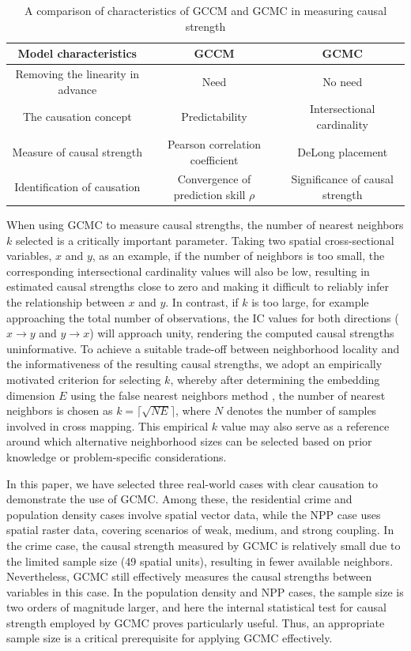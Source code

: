 \documentclass[authoryear,preprint,review,12pt]{elsarticle}
\begin{document}
\begin{table}[htb]
\centering
\caption{A comparison of characteristics of GCCM and GCMC in measuring causal strength}
\label{tbl_diff}
{\scriptsize
\begin{tabular}{|c|c|c|}
\hline
\textbf{Model characteristics} & \textbf{GCCM} & \textbf{GCMC} \\
\hline
Removing the linearity in advance & Need & No need \\
\hline
The causation concept & Predictability & Intersectional cardinality \\
\hline
Measure of causal strength & Pearson correlation coefficient & DeLong placement \\ 
\hline
Identification of causation & Convergence of prediction skill \(\rho\) & Significance of causal strength \\
\hline
\end{tabular}
}
\end{table}

When using GCMC to measure causal strengths, the number of nearest neighbors $k$ selected is a critically important parameter. Taking two spatial cross-sectional variables, $x$ and $y$, as an example, if the number of neighbors is too small, the corresponding intersectional cardinality values will also be low, resulting in estimated causal strengths close to zero and making it difficult to reliably infer the relationship between $x$ and $y$. In contrast, if $k$ is too large, for example approaching the total number of observations, the IC values for both directions ($x \to y$ and $y \to x$) will approach unity, rendering the computed causal strengths uninformative. To achieve a suitable trade-off between neighborhood locality and the informativeness of the resulting causal strengths, we adopt an empirically motivated criterion for selecting $k$, whereby after determining the embedding dimension $E$ using the false nearest neighbors method \citep{kennel1992fnn}, the number of nearest neighbors is chosen as $k = \lceil \sqrt{N E} \rceil$, where $N$ denotes the number of samples involved in cross mapping. This empirical $k$ value may also serve as a reference around which alternative neighborhood sizes can be selected based on prior knowledge or problem-specific considerations.

In this paper, we have selected three real-world cases with clear causation to demonstrate the use of GCMC. Among these, the residential crime and population density cases involve spatial vector data, while the NPP case uses spatial raster data, covering scenarios of weak, medium, and strong coupling. In the crime case, the causal strength measured by GCMC is relatively small due to the limited sample size (49 spatial units), resulting in fewer available neighbors. Nevertheless, GCMC still effectively measures the causal strengths between variables in this case. In the population density and NPP cases, the sample size is two orders of magnitude larger, and here the internal statistical test for causal strength employed by GCMC proves particularly useful. Thus, an appropriate sample size is a critical prerequisite for applying GCMC effectively.
\end{document}
